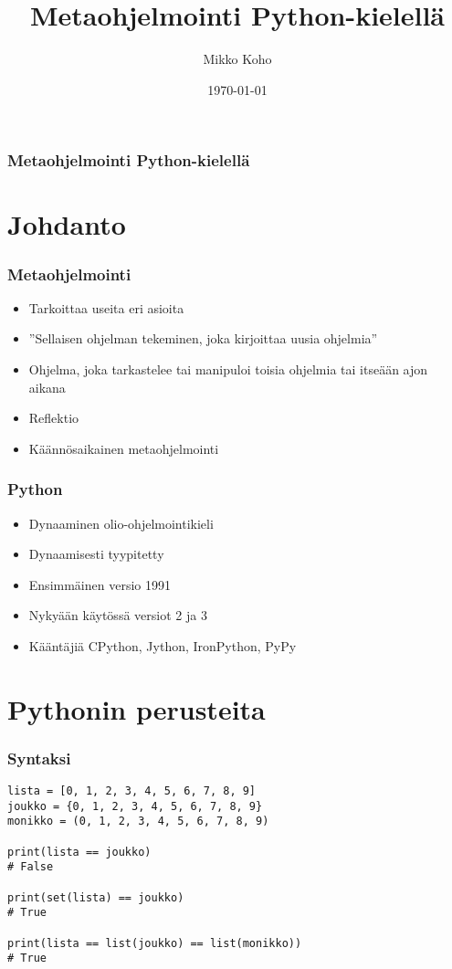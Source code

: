 \documentclass{beamer}
\title{Metaohjelmointi Python-kielellä}
\author{Mikko Koho}
\institute{Helsingin Yliopisto}
\date{\today}
\begin{document}
{
\begin{frame}
\maketitle
\end{frame}
}

\begin{frame}
  \frametitle{Metaohjelmointi Python-kielellä}
  \tableofcontents%
\end{frame}

\section{Johdanto}

\begin{frame}[fragile]
\frametitle{Metaohjelmointi}
\begin{itemize}
\item{Tarkoittaa useita eri asioita}
\item{''Sellaisen ohjelman tekeminen, joka kirjoittaa uusia ohjelmia''}
\item{Ohjelma, joka tarkastelee tai manipuloi toisia ohjelmia tai itseään ajon aikana}
\item{Reflektio}
\item{Käännösaikainen metaohjelmointi}
\end{itemize}
\end{frame}

\begin{frame}[fragile]
\frametitle{Python}
\begin{itemize}
\item{Dynaaminen olio-ohjelmointikieli}
\item{Dynaamisesti tyypitetty}
\item{Ensimmäinen versio 1991}
\item{Nykyään käytössä versiot 2 ja 3}
\item{Kääntäjiä CPython, Jython, IronPython, PyPy}
\end{itemize}
\end{frame}

\section{Pythonin perusteita}

\begin{frame}[fragile]
\frametitle{Syntaksi}
\begin{verbatim}
lista = [0, 1, 2, 3, 4, 5, 6, 7, 8, 9]
joukko = {0, 1, 2, 3, 4, 5, 6, 7, 8, 9}
monikko = (0, 1, 2, 3, 4, 5, 6, 7, 8, 9)

print(lista == joukko)
# False

print(set(lista) == joukko)
# True

print(lista == list(joukko) == list(monikko))
# True
\end{verbatim}
\end{frame}
\end{document}
